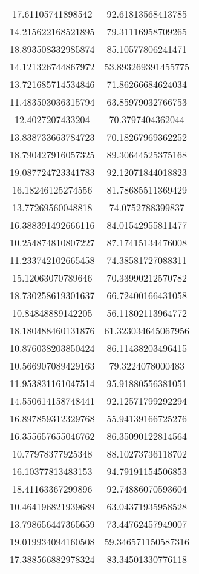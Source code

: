\begin{table}
\begin{tabular}{cc}
17.61105741898542 & 92.61813568413785 \\
14.215622168521895 & 79.31116958709265 \\
18.893508332985874 & 85.10577806241471 \\
14.121326744867972 & 53.893269391455775 \\
13.721685714534846 & 71.86266684624034 \\
11.483503036315794 & 63.85979032766753 \\
12.4027207433204 & 70.3797404362044 \\
13.838733663784723 & 70.18267969362252 \\
18.790427916057325 & 89.30644525375168 \\
19.087724723341783 & 92.12071844018823 \\
16.18246125274556 & 81.78685511369429 \\
13.77269560048818 & 74.0752788399837 \\
16.388391492666116 & 84.01542955811477 \\
10.254874810807227 & 87.17415134476008 \\
11.233742102665458 & 74.38581727088311 \\
15.12063070789646 & 70.33990212570782 \\
18.730258619301637 & 66.72400166431058 \\
10.84848889142205 & 56.11802113964772 \\
18.180488460131876 & 61.323034645067956 \\
10.876038203850424 & 86.11438203496415 \\
10.566907089429163 & 79.3224078000483 \\
11.953831161047514 & 95.91880556381051 \\
14.550614158748441 & 92.12571799292294 \\
16.897859312329768 & 55.94139166725276 \\
16.355657655046762 & 86.35090122814564 \\
10.77978377925348 & 88.10273736118702 \\
16.10377813483153 & 94.79191154506853 \\
18.41163367299896 & 92.74886070593604 \\
10.464196821939689 & 63.04371935958528 \\
13.798656447365659 & 73.44762457949007 \\
19.019934094160508 & 59.346571150587316 \\
17.388566882978324 & 83.34501330776118 \\

\end{tabular}
\end{table}
